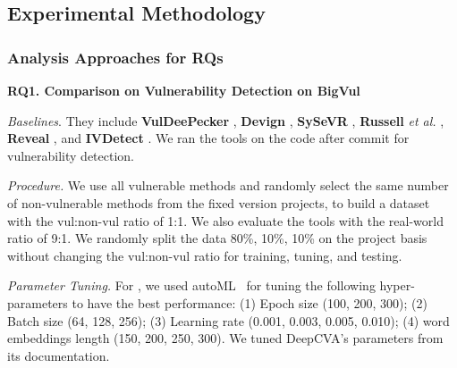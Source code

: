 \subsection{Experimental Methodology}
\label{method:sec}





\subsubsection{\textbf{Analysis Approaches for RQs\\}}

\noindent\textbf{RQ1. Comparison on Vulnerability Detection on BigVul}

\emph{Baselines}. They include
\textbf{VulDeePecker} \cite{li2018vuldeepecker}, \textbf{Devign}
\cite{zhou2019devign}, \textbf{SySeVR} \cite{li2021sysevr},
\textbf{Russell} {\em et al.}  \cite{russell2018automated},
\textbf{Reveal} \cite{chakraborty2021deep}, and {\bf IVDetect}
\cite{li2021vulnerability}. We ran the tools on the code after commit for
vulnerability detection.

\emph{Procedure.}  We use all vulnerable methods and randomly select
the same number of non-vulnerable methods from the fixed version
projects, to build a dataset with the vul:non-vul ratio of 1:1. We
also evaluate the tools with the real-world ratio of 9:1. We randomly split the
data 80\%, 10\%, 10\% on the project basis without changing the
vul:non-vul ratio for training, tuning, and testing.

\emph{Parameter Tuning.}  For {\tool}, we used
autoML~\cite{NNI} for tuning the following hyper-parameters to have the
best performance: (1) Epoch size (100, 200, 300); (2) Batch size (64,
128, 256); (3) Learning rate (0.001, 0.003, 0.005, 0.010); (4) word embeddings length (150, 200, 250, 300). We
tuned DeepCVA's parameters from its documentation.

